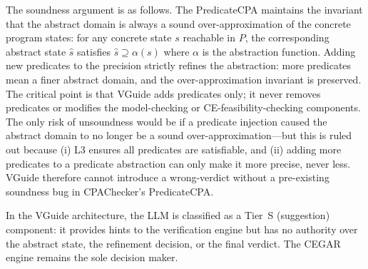 The soundness argument is as follows. The PredicateCPA maintains the invariant that
the abstract domain is always a sound over-approximation of the concrete program
states: for any concrete state $s$ reachable in $P$, the corresponding abstract state
$\hat{s}$ satisfies $\hat{s} \supseteq \alpha(s)$ where $\alpha$ is the abstraction
function. Adding new predicates to the precision strictly refines the abstraction:
more predicates mean a finer abstract domain, and the over-approximation invariant is
preserved. The critical point is that VGuide adds predicates only; it never removes
predicates or modifies the model-checking or CE-feasibility-checking components. The
only risk of unsoundness would be if a predicate injection caused the abstract domain
to no longer be a sound over-approximation---but this is ruled out because (i) L3
ensures all predicates are satisfiable, and (ii) adding more predicates to a predicate
abstraction can only make it more precise, never less. VGuide therefore cannot introduce
a wrong-verdict without a pre-existing soundness bug in CPAChecker's PredicateCPA.

In the VGuide architecture, the LLM is classified as a Tier~S (suggestion) component:
it provides hints to the verification engine but has no authority over the abstract
state, the refinement decision, or the final verdict. The CEGAR engine remains the
sole decision maker.
